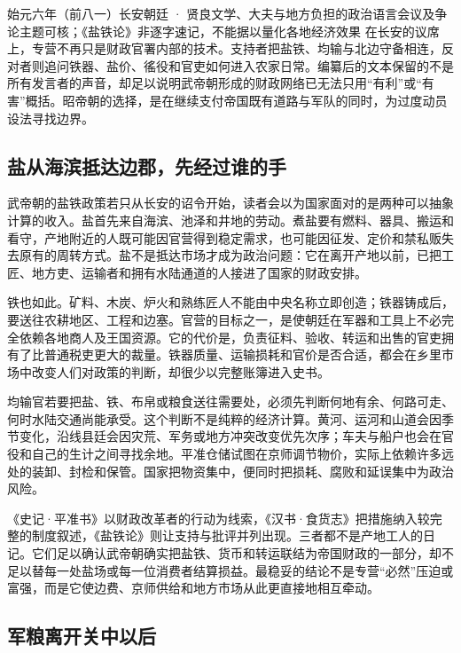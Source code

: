 \begin{event}{}{始元六年（前八一）}{长安朝廷 · 贤良文学、大夫与地方负担的政治语言}{会议及争论主题可核；《盐铁论》非逐字速记，不能据以量化各地经济效果}
在长安的议席上，专营不再只是财政官署内部的技术。支持者把盐铁、均输与北边守备相连，反对者则追问铁器、盐价、徭役和官吏如何进入农家日常。编纂后的文本保留的不是所有发言者的声音，却足以说明武帝朝形成的财政网络已无法只用“有利”或“有害”概括。昭帝朝的选择，是在继续支付帝国既有道路与军队的同时，为过度动员设法寻找边界。
\end{event}

\subsection{盐从海滨抵达边郡，先经过谁的手}

武帝朝的盐铁政策若只从长安的诏令开始，读者会以为国家面对的是两种可以抽象计算的收入。盐首先来自海滨、池泽和井地的劳动。煮盐要有燃料、器具、搬运和看守，产地附近的人既可能因官营得到稳定需求，也可能因征发、定价和禁私贩失去原有的周转方式。盐不是抵达市场才成为政治问题：它在离开产地以前，已把工匠、地方吏、运输者和拥有水陆通道的人接进了国家的财政安排。

铁也如此。矿料、木炭、炉火和熟练匠人不能由中央名称立即创造；铁器铸成后，要送往农耕地区、工程和边塞。官营的目标之一，是使朝廷在军器和工具上不必完全依赖各地商人及王国资源。它的代价是，负责征料、验收、转运和出售的官吏拥有了比普通税吏更大的裁量。铁器质量、运输损耗和官价是否合适，都会在乡里市场中改变人们对政策的判断，却很少以完整账簿进入史书。

均输官若要把盐、铁、布帛或粮食送往需要处，必须先判断何地有余、何路可走、何时水陆交通尚能承受。这个判断不是纯粹的经济计算。黄河、运河和山道会因季节变化，沿线县廷会因灾荒、军务或地方冲突改变优先次序；车夫与船户也会在官役和自己的生计之间寻找余地。平准仓储试图在京师调节物价，实际上依赖许多远处的装卸、封检和保管。国家把物资集中，便同时把损耗、腐败和延误集中为政治风险。

《史记·平准书》以财政改革者的行动为线索，《汉书·食货志》把措施纳入较完整的制度叙述，《盐铁论》则让支持与批评并列出现。三者都不是产地工人的日记。它们足以确认武帝朝确实把盐铁、货币和转运联结为帝国财政的一部分，却不足以替每一处盐场或每一位消费者结算损益。最稳妥的结论不是专营“必然”压迫或富强，而是它使边费、京师供给和地方市场从此更直接地相互牵动。

\subsection{军粮离开关中以后}

